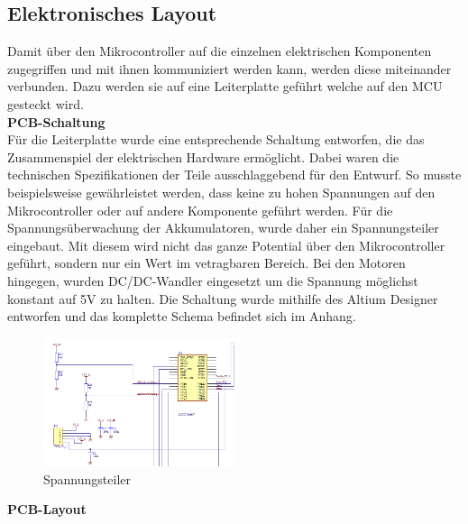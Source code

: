 \subsection{Elektronisches Layout}
Damit über den Mikrocontroller auf die einzelnen elektrischen Komponenten zugegriffen und mit ihnen kommuniziert werden kann, werden diese miteinander verbunden. Dazu werden sie auf eine Leiterplatte geführt welche auf den MCU gesteckt wird.
\\[0.2cm]

\textbf{PCB-Schaltung}\\[0.2cm]
Für die Leiterplatte wurde eine entsprechende Schaltung entworfen, die das Zusammenspiel der elektrischen Hardware ermöglicht. Dabei waren die technischen Spezifikationen der Teile ausschlaggebend für den Entwurf.
So musste beispielsweise gewährleistet werden, dass  keine zu hohen Spannungen auf den Mikrocontroller oder auf andere Komponente geführt werden. Für die Spannungsüberwachung der Akkumulatoren, wurde daher ein Spannungsteiler eingebaut. Mit diesem wird nicht das ganze Potential über den Mikrocontroller geführt, sondern nur ein Wert im vetragbaren Bereich. Bei den Motoren hingegen, wurden DC/DC-Wandler eingesetzt um die Spannung möglichst konstant auf 5V zu halten.
Die Schaltung wurde mithilfe des Altium Designer entworfen und das komplette Schema befindet sich im Anhang.
\\[0.2cm]
\begin{figure}[H]
\centering
\includegraphics[width=0.5\textwidth]{03_Loesungskonzept/pictures/pcbspannungsteiler.png}
\caption{Spannungsteiler}	
\end{figure}

\textbf{PCB-Layout}
\\[0.2cm]
